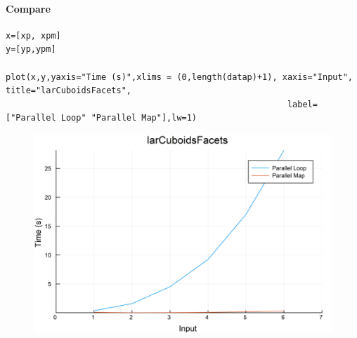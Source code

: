 \documentclass{article}
\begin{document}
\paragraph{Compare}
\begin{flushleft}\small
\begin{list}{}{} \item
    \begin{Verbatim}[tabsize=4]
x=[xp, xpm]
y=[yp,ypm]

plot(x,y,yaxis="Time (s)",xlims = (0,length(datap)+1), xaxis="Input", title="larCuboidsFacets",
                                                        label=["Parallel Loop" "Parallel Map"],lw=1)
    \end{Verbatim}
\end{list}
\end{flushleft}
\begin{figure}[h!]
\centering
\includegraphics[scale=0.06]{larCuboidsFacetsComPar.png}
\end{figure}
\end{document}
